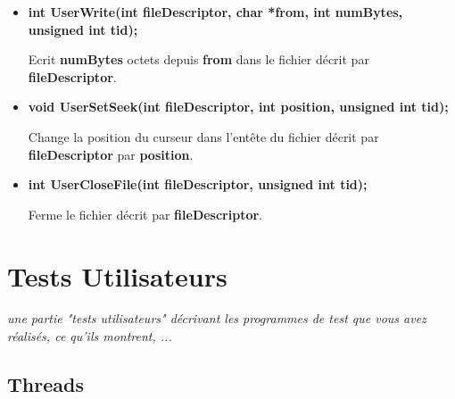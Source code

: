 \documentclass{article}
\begin{document}
\begin{itemize}
\begin{itemize}
    \item
    \textbf{int UserWrite(int fileDescriptor, char *from, int numBytes, unsigned int tid);}

	Ecrit \textbf{numBytes} octets depuis \textbf{from} dans le fichier décrit par \textbf{fileDescriptor}.

    \item
    \textbf{void UserSetSeek(int fileDescriptor, int position, unsigned int tid);}

	Change la position du curseur dans l'entête du fichier décrit par \textbf{fileDescriptor} par \textbf{position}.

    \item
    \textbf{int UserCloseFile(int fileDescriptor, unsigned int tid);}

	Ferme le fichier décrit par \textbf{fileDescriptor}.

\end{itemize}

\end{itemize}

\newpage

\newpage
\section{Tests Utilisateurs}
\textit{une partie "tests utilisateurs" décrivant les programmes de test que vous avez réalisés, ce qu'ils montrent, ...}
\vspace{5mm}

\subsection{Threads}
\end{document}

